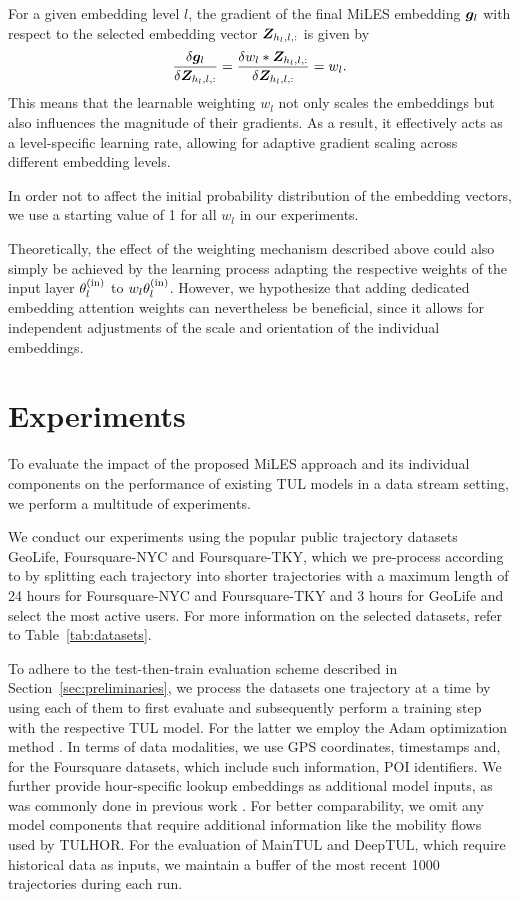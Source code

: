 \documentclass{article} %
\theoremstyle{definition}
\begin{document}
For a given embedding level $l$, the gradient of the final MiLES embedding ${\bm{g}}_l$ with respect to the selected embedding vector ${\bm{Z}}_{h_l, l,:}$ is given by
$$\frac{\delta {\bm{g}}_l}{\delta {\bm{Z}}_{h_l, l,:}} = \frac{\delta w_l * {\bm{Z}}_{h_l, l,:}}{\delta {\bm{Z}}_{h_l, l,:}} = w_l.$$
This means that the learnable weighting $w_l$ not only scales the embeddings but also influences the magnitude of their gradients.
As a result, it effectively acts as a level-specific learning rate, allowing for adaptive gradient scaling across different embedding levels.

In order not to affect the initial probability distribution of the embedding vectors, we use a starting value of 1 for all $w_l$ in our experiments.

Theoretically, the effect of the weighting mechanism described above could also simply be achieved by the learning process adapting the respective weights of the input layer $\theta_l^{(\rm{in})}$ to $w_l\theta_l^{(\rm{in})}$. However, we hypothesize that adding dedicated embedding attention weights can nevertheless be beneficial, since it allows for independent adjustments of the scale and orientation of the individual embeddings.

\section{Experiments}

To evaluate the impact of the proposed MiLES approach and its individual components on the performance of existing TUL models in a data stream setting, we perform a multitude of experiments.

We conduct our experiments using the popular public trajectory datasets GeoLife, Foursquare-NYC and Foursquare-TKY, which we pre-process according to \citet{chenMutualDistillationLearning2022a} by splitting each trajectory into shorter trajectories with a maximum length of 24 hours for Foursquare-NYC and Foursquare-TKY and 3 hours for GeoLife and select the most active users.
For more information on the selected datasets, refer to Table~\ref{tab:datasets}.

To adhere to the test-then-train evaluation scheme described in Section~\ref{sec:preliminaries}, we process the datasets one trajectory at a time by using each of them to first evaluate and subsequently perform a training step with the respective TUL model.
For the latter we employ the Adam optimization method \cite{kingmaAdamMethodStochastic2017a}.
In terms of data modalities, we use GPS coordinates, timestamps and, for the Foursquare datasets, which include such information, POI identifiers.
We further provide hour-specific lookup embeddings as additional model inputs, as was commonly done in previous work \citep[see e.g.][]{chenMutualDistillationLearning2022a,miaoTrajectoryUserLinkingAttentive2020}.
For better comparability, we omit any model components that require additional information like the mobility flows used by TULHOR.
For the evaluation of MainTUL and DeepTUL, which require historical data as inputs, we maintain a buffer of the most recent 1000 trajectories during each run.
\end{document}

